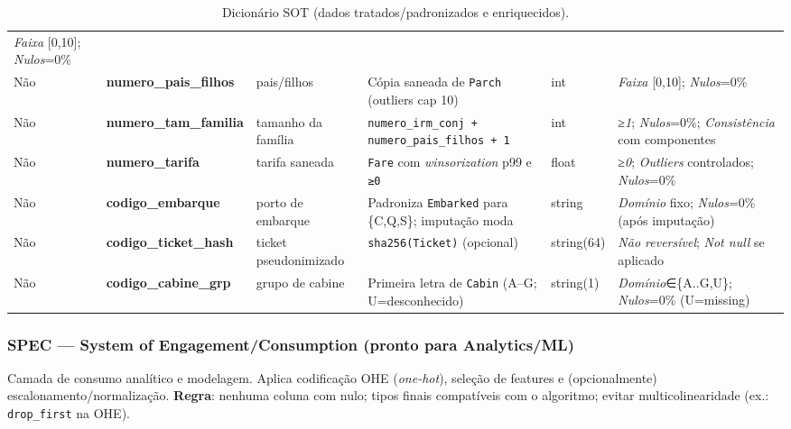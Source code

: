 \documentclass[12pt,a4paper]{article}
\begin{document}
\begin{table}[h!]
\begin{tabular}{@{}llp{3.2cm}p{6.1cm}lp{6.2cm}@{}}
\textit{Faixa} [0,10]; \textit{Nulos}=0\% \\
Não  & \textbf{numero\_pais\_filhos} & pais/filhos &
Cópia saneada de \texttt{Parch} (outliers cap 10) & int &
\textit{Faixa} [0,10]; \textit{Nulos}=0\% \\
Não  & \textbf{numero\_tam\_familia} & tamanho da família &
\texttt{numero\_irm\_conj + numero\_pais\_filhos + 1} & int &
\textit{≥1}; \textit{Nulos}=0\%; \textit{Consistência} com componentes \\
Não  & \textbf{numero\_tarifa}     & tarifa saneada &
\texttt{Fare} com \textit{winsorization} p99 e \texttt{≥0} & float &
\textit{≥0}; \textit{Outliers} controlados; \textit{Nulos}=0\% \\
Não  & \textbf{codigo\_embarque}   & porto de embarque &
Padroniza \texttt{Embarked} para \{C,Q,S\}; imputação moda & string &
\textit{Domínio} fixo; \textit{Nulos}=0\% (após imputação) \\
Não  & \textbf{codigo\_ticket\_hash} & ticket pseudonimizado &
\texttt{sha256(Ticket)} (opcional) & string(64) &
\textit{Não reversível}; \textit{Not null} se aplicado \\
Não  & \textbf{codigo\_cabine\_grp} & grupo de cabine &
Primeira letra de \texttt{Cabin} (A–G; U=desconhecido) & string(1) &
\textit{Domínio}∈\{A..G,U\}; \textit{Nulos}=0\% (U=missing) \\
\bottomrule
\end{tabular}
\caption{Dicionário SOT (dados tratados/padronizados e enriquecidos).}
\end{table}

\subsubsection*{SPEC — System of Engagement/Consumption (pronto para Analytics/ML)}
Camada de consumo analítico e modelagem. Aplica codificação OHE (\textit{one-hot}), seleção de features e (opcionalmente) escalonamento/normalização. \textbf{Regra}: nenhuma coluna com nulo; tipos finais compatíveis com o algoritmo; evitar multicolinearidade (ex.: \texttt{drop\_first} na OHE).
\end{document}
